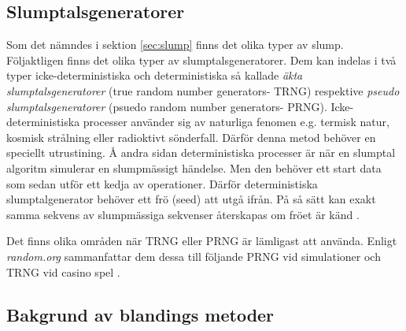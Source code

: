 \documentclass[swedish,a4paper]{article}
\begin{document}
\subsection{Slumptalsgeneratorer}
\label{sec:prng}

Som det nämndes i sektion \ref{sec:slump}  finns det olika typer av slump.
Följaktligen finns det olika typer av slumptalsgeneratorer. Dem kan indelas i två
typer icke-deterministiska och deterministiska så kallade \textit{äkta
slumptalsgeneratorer} (true random number generators- TRNG) respektive 
\textit{pseudo slumptalsgeneratorer} (psuedo random number
generators- PRNG). Icke-deterministiska processer använder sig av naturliga
fenomen e.g. termisk natur, kosmisk strålning eller radioktivt sönderfall.
Därför denna metod behöver en speciellt utrustining. Å andra sidan
deterministiska processer är när en slumptal algoritm simulerar en slumpmässigt
händelse. Men den behöver ett start data som sedan utför ett kedja av
operationer. Därför deterministiska slumptalgenerator behöver ett frö (seed) att
utgå ifrån. På så sätt kan exakt samma sekvens av slumpmässiga sekvenser
återskapas om fröet
är känd \parencite{salinhanes2011}.

Det finns olika områden när TRNG eller PRNG är lämligast att använda.
Enligt \textit{random.org} sammanfattar dem dessa till följande PRNG vid simulationer och
TRNG vid casino spel \parencite{randomorg}. 


%
%

\subsection{Bakgrund av blandings metoder}
\end{document}
